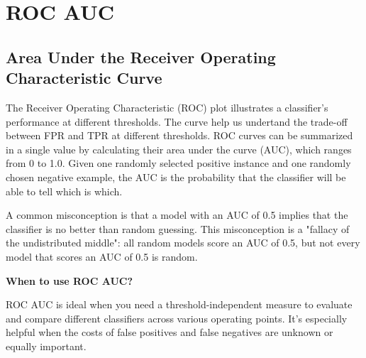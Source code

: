\clearpage
\thispagestyle{classificationstyle}
\section{ROC AUC}
\subsection{Area Under the Receiver Operating Characteristic Curve}

The Receiver Operating Characteristic (ROC) plot illustrates a classifier's performance at different thresholds. The curve help us undertand the trade-off between FPR
and TPR at different thresholds. ROC curves can be summarized in a single value by calculating their area under the curve (AUC), which ranges from 0 to 1.0.
Given one randomly selected positive instance and one randomly chosen negative example, the AUC is the probability that the classifier will be able to tell which is which.

\begin{center}
\end{center}

A common misconception is that a model with an AUC of 0.5 implies that the classifier is no better than random guessing. This misconception is a "fallacy of the undistributed middle":
all random models score an AUC of 0.5, but not every model that scores an AUC of 0.5 is random.

\textbf{When to use ROC AUC?}

ROC AUC is ideal when you need a threshold-independent measure to evaluate and compare different classifiers across various operating points. It's especially helpful when the costs of
false positives and false negatives are unknown or equally important.

